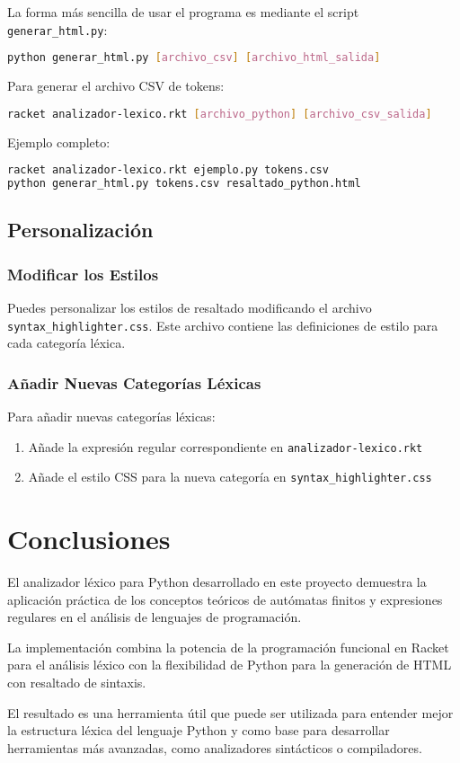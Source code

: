 \documentclass[12pt,letterpaper]{report}
\begin{document}
La forma más sencilla de usar el programa es mediante el script \texttt{generar\_html.py}:

\begin{lstlisting}[language=bash]
python generar_html.py [archivo_csv] [archivo_html_salida]
\end{lstlisting}

Para generar el archivo CSV de tokens:

\begin{lstlisting}[language=bash]
racket analizador-lexico.rkt [archivo_python] [archivo_csv_salida]
\end{lstlisting}

Ejemplo completo:

\begin{lstlisting}[language=bash]
racket analizador-lexico.rkt ejemplo.py tokens.csv
python generar_html.py tokens.csv resaltado_python.html
\end{lstlisting}

\section{Personalización}

\subsection{Modificar los Estilos}

Puedes personalizar los estilos de resaltado modificando el archivo \texttt{syntax\_highlighter.css}. Este archivo contiene las definiciones de estilo para cada categoría léxica.

\subsection{Añadir Nuevas Categorías Léxicas}

Para añadir nuevas categorías léxicas:

\begin{enumerate}
    \item Añade la expresión regular correspondiente en \texttt{analizador-lexico.rkt}
    \item Añade el estilo CSS para la nueva categoría en \texttt{syntax\_highlighter.css}
\end{enumerate}

\chapter{Conclusiones}

El analizador léxico para Python desarrollado en este proyecto demuestra la aplicación práctica de los conceptos teóricos de autómatas finitos y expresiones regulares en el análisis de lenguajes de programación.

La implementación combina la potencia de la programación funcional en Racket para el análisis léxico con la flexibilidad de Python para la generación de HTML con resaltado de sintaxis.

El resultado es una herramienta útil que puede ser utilizada para entender mejor la estructura léxica del lenguaje Python y como base para desarrollar herramientas más avanzadas, como analizadores sintácticos o compiladores.
\end{document}
